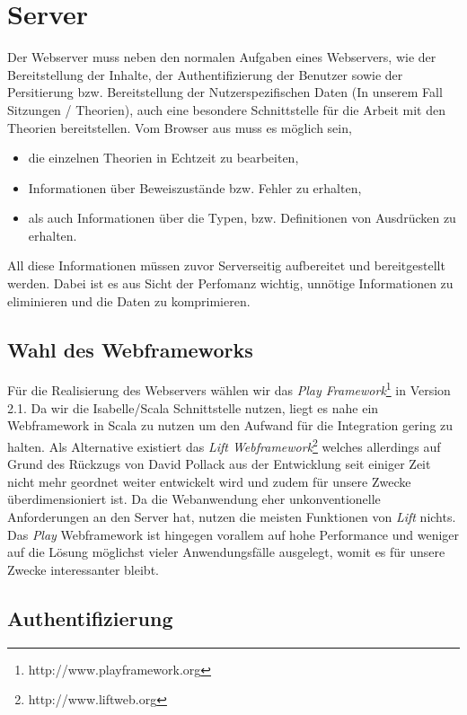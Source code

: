 \section{Server}

Der Webserver muss neben den normalen Aufgaben eines Webservers, wie der Bereitstellung der Inhalte,
der Authentifizierung der Benutzer sowie der Persitierung bzw. Bereitstellung der Nutzerspezifischen
Daten (In unserem Fall Sitzungen / Theorien), auch eine besondere Schnittstelle für die Arbeit mit
den Theorien bereitstellen. Vom Browser aus muss es möglich sein, 

\begin{itemize}
  \item die einzelnen Theorien in Echtzeit zu bearbeiten,
  \item Informationen über Beweiszustände bzw. Fehler zu erhalten,
  \item als auch Informationen über die Typen, bzw. Definitionen von Ausdrücken zu erhalten.
\end{itemize}

All diese Informationen müssen zuvor Serverseitig aufbereitet und bereitgestellt werden. Dabei ist
es aus Sicht der Perfomanz wichtig, unnötige Informationen zu eliminieren und die Daten zu
komprimieren.

\subsection{Wahl des Webframeworks}

Für die Realisierung des Webservers wählen wir das \textit{Play
Framework}\footnote{http://www.playframework.org} in Version 2.1. Da wir die Isabelle/Scala
Schnittstelle nutzen, liegt es nahe ein Webframework in Scala zu nutzen um den Aufwand für die
Integration gering zu halten. Als Alternative existiert das \textit{Lift
Webframework}\footnote{http://www.liftweb.org} welches allerdings auf Grund des Rückzugs von David
Pollack aus der Entwicklung seit einiger Zeit nicht mehr geordnet weiter entwickelt wird und zudem
für unsere Zwecke überdimensioniert ist. Da die Webanwendung eher unkonventionelle Anforderungen an
den Server hat, nutzen die meisten Funktionen von \textit{Lift} nichts. Das \textit{Play}
Webframework ist hingegen vorallem auf hohe Performance und weniger auf die Lösung möglichst vieler
Anwendungsfälle ausgelegt, womit es für unsere Zwecke interessanter bleibt.

\subsection{Authentifizierung}

